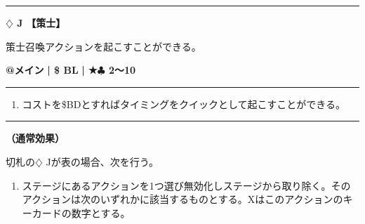 \documentclass[twocolumn,a5paper,papersize,10pt]{jarticle}
\begin{document}
\vspace{-1zh}
  
 

\vspace{3mm} %
\hrule height 0.5mm depth 0mm width 66.5mm %
\vspace{1mm} %
{\Large\bf $\diamondsuit$ J} {\normalsize\bf【策士】} %
\vspace{1mm} %

策士召喚アクションを起こすことができる。

\begin{tcolorbox}[title={\small\bf【Action】策士召喚}{\scriptsize （召喚）}]

{\scriptsize\bf @メイン }
  {\scriptsize\bf | \$ BL }
  {\scriptsize\bf | ★{\normalsize $\clubsuit$} 2〜10}

\vspace{1mm} %
\hrule height 0.1mm depth 0mm width 62mm %
\vspace{1mm} %


\vspace{-1zh}%
\begin{enumerate}
\renewcommand{\labelenumi}{※}
\setlength{\leftskip}{-0.3cm}
\setlength{\itemsep}{0pt} %
\setlength{\parskip}{0pt} %

\item コストを\$BDとすればタイミングをクイックとして起こすことができる。

\vspace{-3mm}%
\end{enumerate}
\vspace{-2mm} %
\vspace{1zh}%
\vspace{1mm} %
\hrule height 0.1mm depth 0mm width 62mm %
\vspace{1mm} %

{\bf（通常効果）}

切札の{\normalsize $\diamondsuit$} Jが表の場合、次を行う。


\vspace{-1zh}%
\begin{enumerate}
\setlength{\leftskip}{-0.3cm}
\setlength{\parskip}{0pt} %

\item ステージにあるアクションを1つ選び無効化しステージから取り除く。そのアクションは次のいずれかに該当するものとする。Xはこのアクションのキーカードの数字とする。


\end{enumerate}
\end{tcolorbox}
\end{document}
